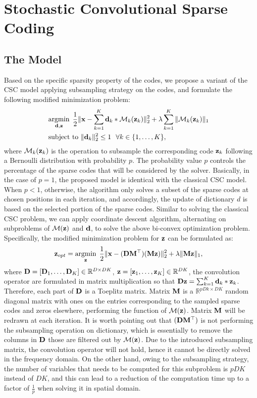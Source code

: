 \section{Stochastic Convolutional Sparse Coding}
\subsection{The Model}
Based on the specific sparsity property of the codes, we propose a variant of the CSC model applying subsampling strategy on the codes,
and formulate the following modified minimization problem:
\begin{align}
    &\minimize{\filter,\code}  \frac{1}{2}\|\signal - \sum_{k=1}^{K} \filter_k * \mathcal{M}_k(\code_k) \|_2^2 + \lambda \sum_{k=1}^{K}\| \mathcal{M}_k(\code_k) \|_1  \nonumber \\
    &\text{subject to} ~ \|\filter_k\|^2_2 \leq 1 ~~ \forall k \in \{1,\dots,K\},
\end{align}
where $\mathcal{M}_k(\code_k)$ is the operation to subsample the corresponding code $\code_k$ following a Bernoulli distribution with probability $p$. The probability value $p$ controls the percentage of the sparse codes that will be considered by the solver. Basically, in the case of $p=1$, the proposed model is identical with the classical CSC model. When $p<1$, otherwise, the algorithm only solves a subset of the sparse codes at chosen positions in each iteration, and accordingly, the update of dictionary $d$ is based on the selected portion of the sparse codes. Similar to solving the classical CSC problem, we can apply coordinate descent algorithm, alternating on subproblems of $\mathcal{M}(\code)$ and $\filter$, to solve the above bi-convex optimization problem. Specifically, the modified minimization problem for $\code$ can be formulated as:
\begin{equation} \label{eq:updatingCode}
    \code_{opt} = \minimize{\code} \frac{1}{2}\|\signal - (\Filter \mask^\top)(\mask \code) \|_2^2 + \lambda \|\mask \code\|_1,
\end{equation}
where $\Filter = [\Filter_1, \dots, \Filter_K] \in \mathbb{R}^{D \times DK}$, $\code = [\code_1, \dots, \code_K] \in \mathbb{R}^{DK}$, the convolution operator are formulated in matrix multiplication so that $ \Filter \code = \sum_{k=1}^{K} \filter_k * \code_k$. Therefore, each part of $\Filter$ is a Toeplitz matrix. Matrix $\mask$ 
is a $\mathbb{R}^{pDk \times DK}$ random diagonal matrix with ones on the entries corresponding to the sampled sparse codes and zeros elsewhere, performing the function of 
$\mathcal{M}(\code)$. Matrix $\mask$ will be redrawn at each iteration. It is worth pointing out that $(\Filter \mask^\top)$ is not performing the subsampling operation on 
dictionary, which is essentially to remove the columns in $\Filter$ those are filtered out by $\mathcal{M}(\code)$. Due to the introduced subsampling matrix, the convolution 
operator will not hold, hence it cannot be directly solved in the frequency domain. On the other hand, owing to the subsampling strategy, the number of variables that needs 
to be computed for this subproblem is $pDK$ instead of $DK$, and this can lead to a reduction of the computation time up to a factor of $\frac{1}{p}$ when solving it in spatial domain.

